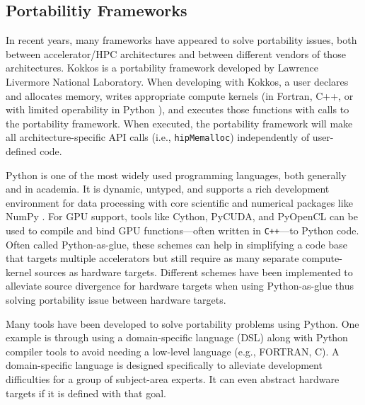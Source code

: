 \subsection{Portabilitiy Frameworks}
In recent years, many frameworks have appeared to solve portability issues, both between accelerator/HPC architectures and between different vendors of those architectures. 
Kokkos \cite{kokkos} is a portability framework developed by Lawrence Livermore National Laboratory.
When developing with Kokkos, a user declares and allocates memory, writes appropriate compute kernels (in Fortran, C++, or with limited operability in Python \cite{AlAwarETAL21PyKokkos}), and executes those functions with calls to the portability framework. 
When executed, the portability framework will make all architecture-specific API calls (i.e., \texttt{hipMemalloc}) independently of user-defined code.


Python is one of the most widely used programming languages, both generally and in academia.
It is dynamic, untyped, and supports a rich development environment for data processing with core scientific and numerical packages like NumPy \cite{van_der_walt_numpy_2011}.
For GPU support, tools like Cython, PyCUDA, and PyOpenCL \cite{kloeckner_pycuda_2012} can be used to compile and bind GPU functions---often written in \texttt{C++}---to Python code.
Often called Python-as-glue, these schemes can help in simplifying a code base that targets multiple accelerators but still require as many separate compute-kernel sources as hardware targets.
Different schemes have been implemented to alleviate source divergence for hardware targets when using Python-as-glue thus solving portability issue between hardware targets.

Many tools have been developed to solve portability problems using Python.
One example is through using a domain-specific language (DSL) along with Python compiler tools to avoid needing a low-level language (e.g., FORTRAN, C).
A domain-specific language is designed specifically to alleviate development difficulties for a group of subject-area experts. 
It can even abstract hardware targets if it is defined with that goal.

